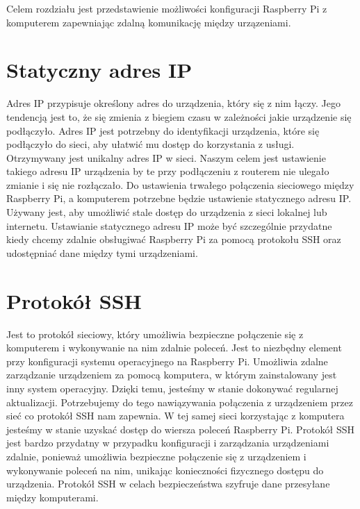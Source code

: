 Celem rozdziału jest przedstawienie możliwości konfiguracji Raspberry Pi z komputerem zapewniając zdalną komunikację między urzązeniami.
\section{Statyczny adres IP}
Adres IP przypisuje określony adres do urządzenia, który się z nim łączy. Jego tendencją jest to, że się zmienia z biegiem czasu w zależności jakie urządzenie się podłączyło. Adres IP jest potrzebny do identyfikacji urządzenia, które się podłączyło do sieci, aby ułatwić mu dostęp do korzystania z usługi. Otrzymywany jest unikalny adres IP w sieci. Naszym celem jest ustawienie takiego adresu IP urządzenia by te przy podłączeniu z routerem nie ulegało zmianie i się nie rozłączało. Do ustawienia trwałego połączenia sieciowego między Raspberry Pi, a komputerem potrzebne będzie ustawienie statycznego adresu IP. Używany jest, aby umożliwić stale dostęp do urządzenia z sieci lokalnej lub internetu. Ustawianie statycznego adresu IP może być szczególnie przydatne kiedy chcemy zdalnie obsługiwać Raspberry Pi za pomocą protokołu SSH oraz udostępniać dane między tymi urządzeniami. 
\section{Protokół SSH}
Jest to protokół sieciowy, który umożliwia bezpieczne połączenie się z komputerem i wykonywanie na nim zdalnie poleceń. Jest to niezbędny element przy konfiguracji systemu operacyjnego na Raspberry Pi. Umożliwia zdalne zarządzanie urządzeniem za pomocą komputera, w którym zainstalowany jest inny system operacyjny. Dzięki temu, jesteśmy w stanie dokonywać regularnej aktualizacji. Potrzebujemy do tego nawiązywania połączenia z urządzeniem przez sieć co protokół SSH nam zapewnia. W tej samej sieci korzystając z komputera jesteśmy w stanie uzyskać dostęp do wiersza poleceń Raspberry Pi. Protokół SSH jest bardzo przydatny w przypadku konfiguracji i zarządzania urządzeniami zdalnie, ponieważ umożliwia bezpieczne połączenie się z urządzeniem i wykonywanie poleceń na nim, unikając konieczności fizycznego dostępu do urządzenia. Protokół SSH w celach bezpieczeństwa szyfruje dane przesyłane między komputerami.